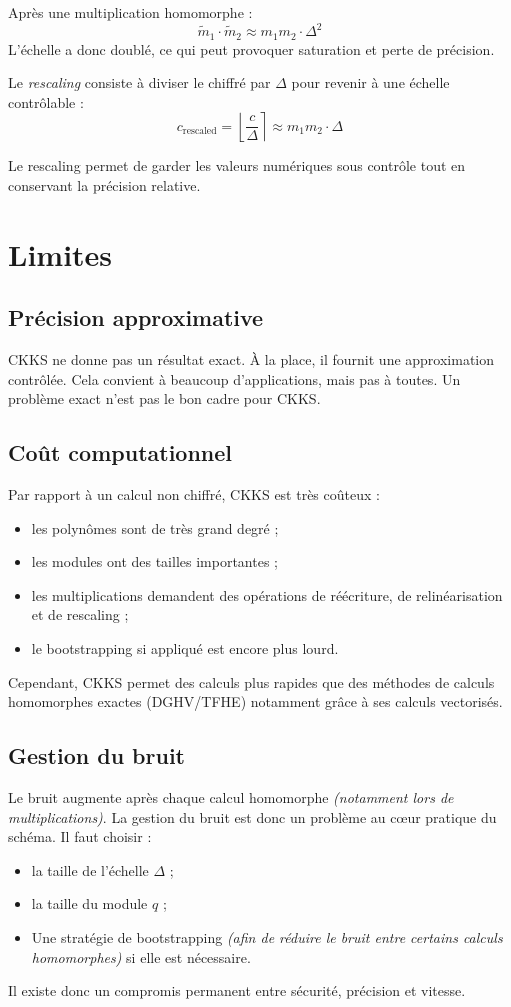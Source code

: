 Après une multiplication homomorphe :
\[
\tilde{m}_1 \cdot \tilde{m}_2 \approx m_1 m_2 \cdot \Delta^2
\]
L'échelle a donc doublé, ce qui peut provoquer saturation et perte de précision.

Le \emph{rescaling} consiste à diviser le chiffré par $\Delta$ pour revenir à une échelle contrôlable :
\[
c_{\text{rescaled}} = \left\lfloor \frac{c}{\Delta} \right\rceil \approx m_1 m_2 \cdot \Delta
\]

Le rescaling permet de garder les valeurs numériques sous contrôle tout en conservant la précision relative.

\section{Limites}

\subsection{Précision approximative}

CKKS ne donne pas un résultat exact. À la place, il fournit une approximation contrôlée. Cela convient à beaucoup d'applications, mais pas à toutes. Un problème exact n'est pas le bon cadre pour CKKS.

\subsection{Coût computationnel}

Par rapport à un calcul non chiffré, CKKS est très coûteux :
\begin{itemize}[leftmargin=2em]
  \item les polynômes sont de très grand degré ;
  \item les modules ont des tailles importantes ;
  \item les multiplications demandent des opérations de réécriture, de relinéarisation et de rescaling ;
  \item le bootstrapping si appliqué est encore plus lourd.
\end{itemize}

Cependant, CKKS permet des calculs plus rapides que des méthodes de calculs homomorphes exactes (DGHV/TFHE) notamment grâce à ses calculs vectorisés.

\subsection{Gestion du bruit}
Le bruit augmente après chaque calcul homomorphe \emph{(notamment lors de multiplications)}.
La gestion du bruit est donc un problème au cœur pratique du schéma. Il faut choisir :
\begin{itemize}[leftmargin=2em]
  \item la taille de l'échelle $\Delta$ ;
  \item la taille du module $q$ ;
  \item Une stratégie de bootstrapping \emph{(afin de réduire le bruit entre certains calculs homomorphes)} si elle est nécessaire.
\end{itemize}

Il existe donc un compromis permanent entre sécurité, précision et vitesse.